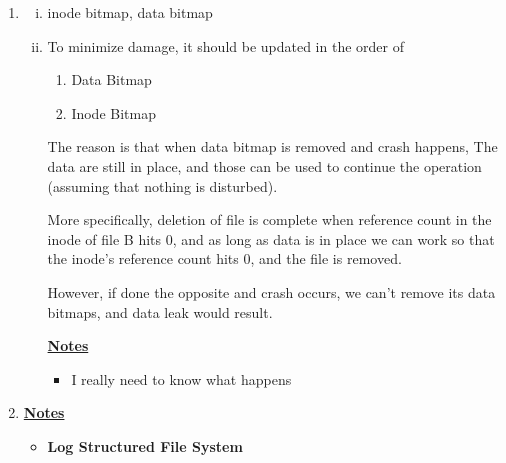 \documentclass[12pt]{article}
\begin{document}
\begin{enumerate}[1.]
\begin{enumerate}[1)]
        \item

        \begin{enumerate}[i)]
            \item inode bitmap, data bitmap
            \item

            To minimize damage, it should be updated in the order of

            \bigskip

            \begin{enumerate}[1.]
                \item Data Bitmap
                \item Inode Bitmap
            \end{enumerate}

            \bigskip

            The reason is that when data bitmap is removed and crash happens,
            The data are still in place, and those can be used to continue the operation
            (assuming that nothing is disturbed).

            \bigskip

            More specifically, deletion of file is complete when reference count in the inode of
            file B hits 0, and as long as data is in place we can work so that the inode's
            reference count hits 0, and the file is removed.

            \bigskip

            However, if done the opposite and crash occurs, we can't remove its data bitmaps,
            and data leak would result.

            \bigskip

            \underline{\textbf{Notes}}

            \begin{itemize}
                \item I really need to know what happens
            \end{itemize}
        \end{enumerate}

        \item

        \bigskip

        \underline{\textbf{Notes}}

        \begin{itemize}
            \item \textbf{Log Structured File System}
            \bigskip


\end{itemize}
\end{enumerate}
\end{enumerate}
\end{document}
